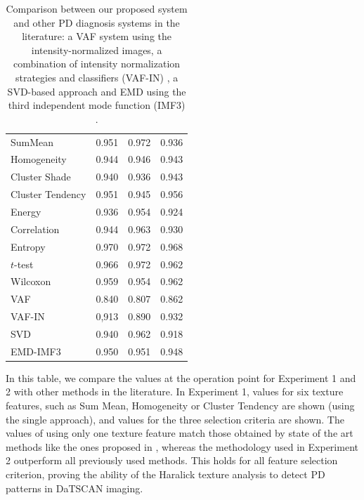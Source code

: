 \begin{table}[ht]
	\centering
	\begin{tabular}{l rrr}
		\toprule
		\tableheadline{System}		& \tableheadline{Acc} 	& \tableheadline{Sens}	& \tableheadline{Spec}	\\ 
		\midrule
		SumMean &  0.951 &    0.972 &    0.936 \\ 
		Homogeneity &  0.944 &    0.946 &    0.943\\
		Cluster Shade &   0.940 &    0.936 &    0.943  \\
		Cluster Tendency &  0.951 &    0.945 &    0.956\\
		Energy &  0.936 &    0.954 &    0.924\\
		Correlation &  0.944 &    0.963 &     0.930\\
		\midrule
		Entropy       & 0.970 & 0.972 & 0.968 \\
		$t$-test       & 0.966 & 0.972 & 0.962  \\
		Wilcoxon & 0.959 & 0.954 & 0.962  \\
		\midrule
		VAF & 0.840	& 0.807	& 0.862	 \\
		VAF-IN & 0,913 & 0.890 & 0.932 \\
		SVD & 0.940 & 0.962 & 0.918 \\
		EMD-IMF3 & 0.950 & 0.951 & 0.948 \\
		\bottomrule
	\end{tabular}
	\vspace{10pt}
	\caption[Comparison between our proposed system and other \ac{PD} diagnosis systems in the literature.]{Comparison between our proposed system and other \ac{PD} diagnosis systems in the literature: a VAF system using the intensity-normalized images,  a combination of intensity normalization strategies and classifiers (VAF-IN) \cite{Illan2012}, a SVD-based approach \cite{Segovia2012} and EMD using the third independent mode function (IMF3) \cite{Rojas2012}.}
	\label{tab:comparison}
\end{table}

In this table, we compare the values at the operation point for Experiment 1 and 2 with other methods in the literature. In Experiment 1, values for six texture features, such as Sum Mean, Homogeneity or Cluster Tendency are shown (using the single approach), and values for the three selection criteria are shown. The values of using only one texture feature match those obtained by state of the art methods like the ones proposed in \cite{Segovia2012,Rojas2012}, whereas the methodology used in Experiment 2 outperform all previously used methods. This holds for all feature selection criterion, proving the ability of the Haralick texture analysis to detect \ac{PD} patterns in DaTSCAN imaging. 
